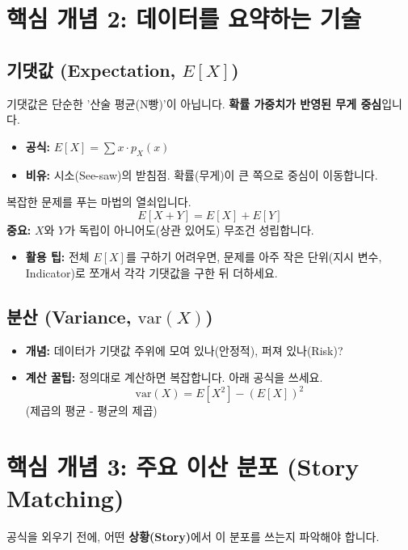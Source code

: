 \documentclass[11pt,a4paper]{book}
\theoremstyle{definition}
\begin{document}
\section{핵심 개념 2: 데이터를 요약하는 기술}

\subsection{기댓값 (Expectation, $E[X]$)}
기댓값은 단순한 '산술 평균(N빵)'이 아닙니다. \textbf{확률 가중치가 반영된 무게 중심}입니다.

\begin{itemize}
    \item \textbf{공식:} $E[X] = \sum x \cdot p_X(x)$
    \item \textbf{비유:} 시소(See-saw)의 받침점. 확률(무게)이 큰 쪽으로 중심이 이동합니다.
\end{itemize}

\begin{toolbox}[title={기댓값의 선형성 (Linearity of Expectation)}]
복잡한 문제를 푸는 마법의 열쇠입니다.
\[ E[X + Y] = E[X] + E[Y] \]
\textbf{중요:} $X$와 $Y$가 독립이 아니어도(상관 있어도) 무조건 성립합니다.
\begin{itemize}
    \item \textbf{활용 팁:} 전체 $E[X]$를 구하기 어려우면, 문제를 아주 작은 단위(지시 변수, Indicator)로 쪼개서 각각 기댓값을 구한 뒤 더하세요.
\end{itemize}
\end{toolbox}

\subsection{분산 (Variance, $\text{var}(X)$)}
\begin{itemize}
    \item \textbf{개념:} 데이터가 기댓값 주위에 모여 있나(안정적), 퍼져 있나(Risk)?
    \item \textbf{계산 꿀팁:} 정의대로 계산하면 복잡합니다. 아래 공식을 쓰세요.
    \[ \text{var}(X) = E[X^2] - (E[X])^2 \]
    (제곱의 평균 - 평균의 제곱)
\end{itemize}

\section{핵심 개념 3: 주요 이산 분포 (Story Matching)}
공식을 외우기 전에, 어떤 \textbf{상황(Story)}에서 이 분포를 쓰는지 파악해야 합니다.
\end{document}
